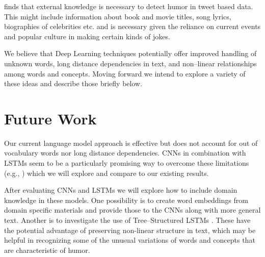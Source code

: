 \documentclass[11pt,a4paper]{article}
\begin{document}
\cite{PotashRR16} finds that 
external knowledge is necessary to detect humor in tweet
based data. This might include information about book and movie
titles, song lyrics, biographies of celebrities etc. and is
necessary given the reliance on current events and
popular culture in making certain kinds of jokes.

We believe that Deep Learning techniques potentially offer
improved handling of unknown words, long distance dependencies
in text, and non--linear relationships among words and
concepts. Moving forward we intend to explore a variety of
these ideas and describe those briefly below.

\section{Future Work}

Our current language model approach is effective but 
does not account for out of vocabulary
words nor long distance dependencies. CNNs in combination with
LSTMs seem to be a particularly promising way to overcome 
these limitations (e.g., \cite{BerteroF16}) which we will
explore and compare to our existing results.

After evaluating
CNNs and LSTMs we will explore how to include domain knowledge
in these models. One possibility is to
create word embeddings
from domain specific materials and provide those to the CNNs
along with more general text. Another is to investigate the use
of Tree--Structured LSTMs \cite{TaiSM15}. These have the potential
advantage of preserving non-linear structure in text, which may
be helpful in recognizing some of the unusual variations of words
and concepts that are characteristic of humor. 

 
%
%


\end{document}

